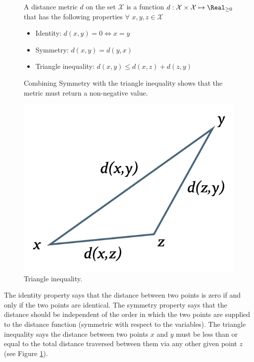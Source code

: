 \begin{figure}[h!]
\begin{lookbox}
\begin{minipage}[b]{0.63\textwidth}
A distance metric $d$ on the set $\mathcal{X}$ is a function $d:\mathcal{X}\times\mathcal{X}\mapsto\Real_{\geq 0}$ that has the following properties $\forall\,\,x, y, z\in\mathcal{X}$
\begin{itemize}
\item Identity: $d(x,y)=0 \Leftrightarrow x=y$
\item Symmetry: $d(x,y)=d(y,x)$
\item Triangle inequality: $d(x,y)\leq d(x,z)+d(z,y)$
\end{itemize}
Combining Symmetry with the triangle inequality shows that the metric must return a non-negative value.
\end{minipage}\hspace{0.05\textwidth}
\begin{minipage}[b]{0.31\textwidth}
\includegraphics[width=\textwidth]{04_IndividualFairness/figures/Fig_TriangleInequality.png}\vspace{-8pt}
\caption{Triangle inequality.}
\label{fig:TriIneq}
\end{minipage}
\end{lookbox}
\end{figure}\vspace{-\baselineskip}

\noindent The identity property says that the distance between two points is zero if and only if the two points are identical. The symmetry property says that the distance should be independent of the order in which the two points are supplied to the distance function (symmetric with respect to the variables). The triangle inequality says the distance between two points $x$ and $y$ must be less than or equal to the total distance traversed between them via any other given point $z$ (see Figure \ref{fig:TriIneq}).

